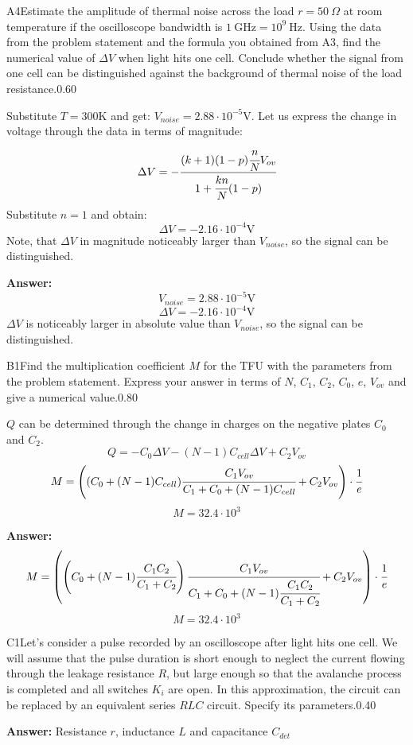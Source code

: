 \documentclass[11pt,a4paper]{article}
\begin{document}
\begin{solcard}{A4}{Estimate the amplitude of thermal noise across the load $r = 50~\Omega$ at room temperature if the oscilloscope bandwidth is $1~\text{GHz}=10^9~\text{Hz}$. Using the data from the problem statement and the formula you obtained from A3, find the numerical value of $\Delta{V}$ when light hits one cell.  Conclude whether the signal from one cell can be distinguished against the background of thermal noise of the load resistance.}{0.60}

Substitute $T = 300 \text{K}$ and get: $V_{noise} = 2.88\cdot10^{-5} \text{V}$. Let us express the change in voltage through the data in terms of magnitude: $$\Delta V = -\cfrac{(k+1)(1-p)\cfrac{n}{N}V_{ov}}{1 + \cfrac{kn}{N}(1-p)}$$Substitute $n = 1$ and obtain: $$\Delta V = -2.16\cdot10^{-4} \text{V}$$Note, that $\Delta V$ in magnitude noticeably larger than $V_{noise}$, so the signal can be distinguished.

\par\smallskip\noindent\textbf{Answer:} $$V_{noise} = 2.88\cdot10^{-5} \text{V}$$$$\Delta V = -2.16\cdot10^{-4} \text{V}$$$\Delta V$ is noticeably larger in absolute value than $V_{noise}$, so the signal can be distinguished.
\end{solcard}

\begin{solcard}{B1}{Find the multiplication coefficient $M$ for the TFU with the parameters from the problem statement. Express your answer in terms of $N$, $C_1$, $C_2$, $C_0$, $e$, $V_{ov}$ and give a numerical value.}{0.80}

$Q$ can be determined through the change in charges on the negative plates $C_0$ and $C_2$. $$Q = - C_0 \Delta V - (N - 1)C_{cell} \Delta V + C_2 V_{ov}$$$$M =\left( (C_0 + (N-1)C_{cell})\cfrac{ C_1 V_{ov}}{C_1 + C_0 + (N-1)C_{cell}} + C_2 V_{ov}\right)\cdot\cfrac{1}{e}$$$$M = 32.4\cdot10^3$$

\par\smallskip\noindent\textbf{Answer:} $$M =\left( \left(C_0 + (N-1)\cfrac{C_1 C_2}{C_1 + C_2}\right)\cfrac{ C_1 V_{ov}}{C_1 + C_0 + (N-1)\cfrac{C_1 C_2}{C_1 + C_2}} + C_2 V_{ov}\right)\cdot\cfrac{1}{e}$$$$M = 32.4\cdot10^3$$
\end{solcard}

\begin{solcard}{C1}{Let's consider a pulse recorded by an oscilloscope after light hits one cell. We will assume that the pulse duration is short enough to neglect the current flowing through the leakage resistance $R$, but large enough so that the avalanche process is completed and all switches $K_i$ are open. In this approximation, the circuit can be replaced by an equivalent series $RLC$ circuit. Specify its parameters.}{0.40}
\par\smallskip\noindent\textbf{Answer:} Resistance $r$, inductance $L$ and capacitance $C_{det}$
\end{solcard}
\end{document}
